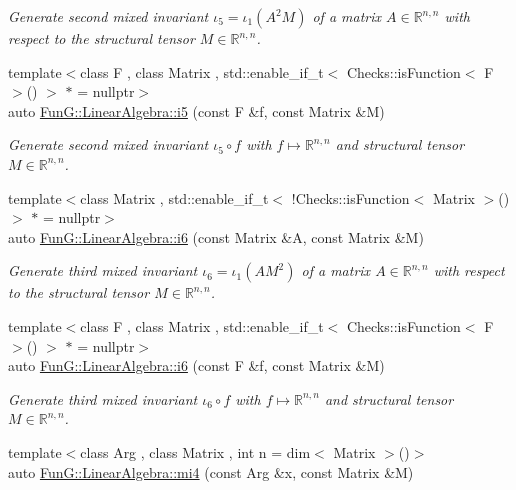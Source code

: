\begin{DoxyCompactItemize}
\begin{DoxyCompactList}\small\item\em Generate second mixed invariant $ \iota_5=\iota_1(A^2M) $ of a matrix $A\in\mathbb{R}^{n,n}$ with respect to the structural tensor $M\in\mathbb{R}^{n,n}$. \end{DoxyCompactList}\item 
{\footnotesize template$<$class F , class Matrix , std\-::enable\-\_\-if\-\_\-t$<$ Checks\-::is\-Function$<$ F $>$() $>$ $\ast$  = nullptr$>$ }\\auto \hyperlink{group__InvariantGroup_gaed7e47c39d89f2b01e25c992da78b44d}{Fun\-G\-::\-Linear\-Algebra\-::i5} (const F \&f, const Matrix \&M)
\begin{DoxyCompactList}\small\item\em Generate second mixed invariant $ \iota_5\circ f $ with $f\mapsto\mathbb{R}^{n,n}$ and structural tensor $M\in\mathbb{R}^{n,n}$. \end{DoxyCompactList}\item 
{\footnotesize template$<$class Matrix , std\-::enable\-\_\-if\-\_\-t$<$ !\-Checks\-::is\-Function$<$ Matrix $>$() $>$ $\ast$  = nullptr$>$ }\\auto \hyperlink{group__InvariantGroup_gad9f0627946667bb052212f65ecdd002b}{Fun\-G\-::\-Linear\-Algebra\-::i6} (const Matrix \&A, const Matrix \&M)
\begin{DoxyCompactList}\small\item\em Generate third mixed invariant $ \iota_6=\iota_1(AM^2) $ of a matrix $A\in\mathbb{R}^{n,n}$ with respect to the structural tensor $M\in\mathbb{R}^{n,n}$. \end{DoxyCompactList}\item 
{\footnotesize template$<$class F , class Matrix , std\-::enable\-\_\-if\-\_\-t$<$ Checks\-::is\-Function$<$ F $>$() $>$ $\ast$  = nullptr$>$ }\\auto \hyperlink{group__InvariantGroup_ga2536c80df733bb3e089487202c3688c1}{Fun\-G\-::\-Linear\-Algebra\-::i6} (const F \&f, const Matrix \&M)
\begin{DoxyCompactList}\small\item\em Generate third mixed invariant $ \iota_6\circ f $ with $f\mapsto\mathbb{R}^{n,n}$ and structural tensor $M\in\mathbb{R}^{n,n}$. \end{DoxyCompactList}\item 
{\footnotesize template$<$class Arg , class Matrix , int n = dim$<$ Matrix $>$()$>$ }\\auto \hyperlink{group__InvariantGroup_ga7ee54c5d056877bdefefb8e54ad17791}{Fun\-G\-::\-Linear\-Algebra\-::mi4} (const Arg \&x, const Matrix \&M)

\end{DoxyCompactItemize}
